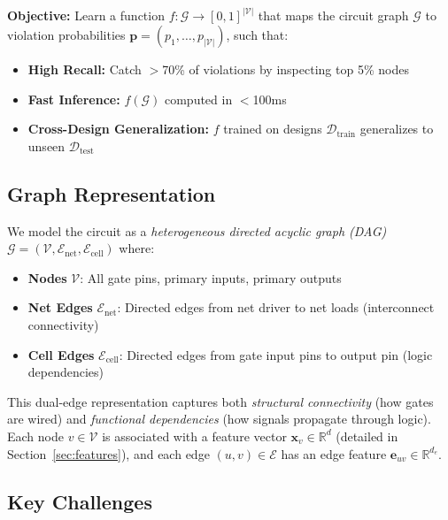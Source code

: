 \documentclass[10pt,twocolumn,journal]{IEEEtran}
\begin{document}
\textbf{Objective:}
Learn a function $f: \mathcal{G} \rightarrow [0,1]^{|\mathcal{V}|}$ that maps the circuit graph $\mathcal{G}$ to violation probabilities $\mathbf{p} = (p_1, \ldots, p_{|\mathcal{V}|})$, such that:
\begin{itemize}
    \item \textbf{High Recall:} Catch $>$70\% of violations by inspecting top 5\% nodes
    \item \textbf{Fast Inference:} $f(\mathcal{G})$ computed in $<$100ms
    \item \textbf{Cross-Design Generalization:} $f$ trained on designs $\mathcal{D}_{\text{train}}$ generalizes to unseen $\mathcal{D}_{\text{test}}$
\end{itemize}

\subsection{Graph Representation}

We model the circuit as a \textit{heterogeneous directed acyclic graph (DAG)} $\mathcal{G} = (\mathcal{V}, \mathcal{E}_{\text{net}}, \mathcal{E}_{\text{cell}})$ where:
\begin{itemize}
    \item \textbf{Nodes} $\mathcal{V}$: All gate pins, primary inputs, primary outputs
    \item \textbf{Net Edges} $\mathcal{E}_{\text{net}}$: Directed edges from net driver to net loads (interconnect connectivity)
    \item \textbf{Cell Edges} $\mathcal{E}_{\text{cell}}$: Directed edges from gate input pins to output pin (logic dependencies)
\end{itemize}

This dual-edge representation captures both \textit{structural connectivity} (how gates are wired) and \textit{functional dependencies} (how signals propagate through logic). Each node $v \in \mathcal{V}$ is associated with a feature vector $\mathbf{x}_v \in \mathbb{R}^d$ (detailed in Section~\ref{sec:features}), and each edge $(u,v) \in \mathcal{E}$ has an edge feature $\mathbf{e}_{uv} \in \mathbb{R}^{d_e}$.

\subsection{Key Challenges}
\end{document}
